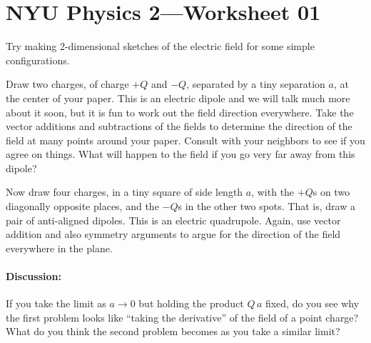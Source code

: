 \documentclass[12pt]{article}
\begin{document}
\section*{NYU Physics 2---Worksheet 01}

Try making 2-dimensional sketches of the electric field for some simple configurations.

\startproblem%
Draw two charges, of charge $+Q$ and $-Q$, separated by a tiny separation $a$, at the center of your paper.
This is an electric dipole and we will talk much more about it soon, but it is fun to work out the field direction everywhere.
Take the vector additions and subtractions of the fields to determine the direction of the field at many points around your paper.
Consult with your neighbors to see if you agree on things.
What will happen to the field if you go very far away from this dipole?

\startproblem%
Now draw four charges, in a tiny square of side length $a$, with the $+Q$s on two diagonally opposite places, and the $-Q$s in the other two spots.
That is, draw a pair of anti-aligned dipoles.
This is an electric quadrupole.
Again, use vector addition and also symmetry arguments to argue for the direction of the field everywhere in the plane.

\paragraph{Discussion:}
If you take the limit as $a\rightarrow 0$ but holding the product $Q\,a$ fixed, do you see why the first problem looks like ``taking the derivative'' of the field of a point charge?
What do you think the second problem becomes as you take a similar limit?
\end{document}
